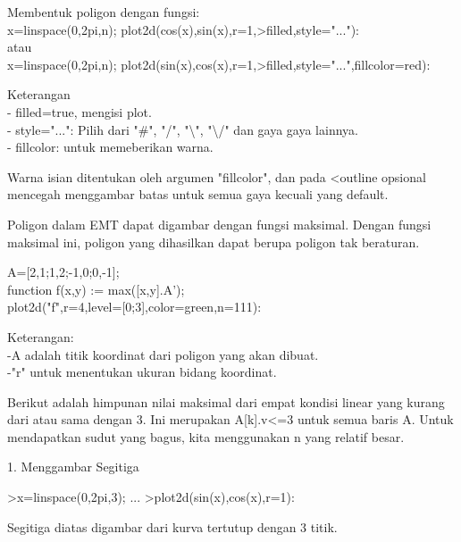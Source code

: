 \documentclass[a4paper,10pt]{article}
\begin{document}
\begin{eulernotebook}
\begin{eulercomment}
\begin{eulercomment}
\begin{eulercomment}
\begin{eulercomment}
\begin{eulercomment}
\begin{eulercomment}
\begin{eulercomment}
\begin{eulercomment}
\begin{eulercomment}
\begin{eulercomment}
\begin{eulercomment}
\begin{eulercomment}
\begin{eulercomment}
Membentuk poligon dengan fungsi:\\
x=linspace(0,2pi,n); plot2d(cos(x),sin(x),r=1,\textgreater{}filled,style="..."):\\
atau\\
x=linspace(0,2pi,n);
plot2d(sin(x),cos(x),r=1,\textgreater{}filled,style="...",fillcolor=red):

Keterangan\\
- filled=true, mengisi plot.\\
- style="...": Pilih dari "#", "/", "\textbackslash{}", "\textbackslash{}/" dan gaya gaya lainnya.\\
- fillcolor: untuk memeberikan warna.

Warna isian ditentukan oleh argumen "fillcolor", dan pada \textless{}outline
opsional mencegah menggambar batas untuk semua gaya kecuali yang
default.

Poligon dalam EMT dapat digambar dengan fungsi maksimal. Dengan fungsi
maksimal ini, poligon yang dihasilkan dapat berupa poligon tak
beraturan.

A=[2,1;1,2;-1,0;0,-1];\\
function f(x,y) := max([x,y].A');\\
plot2d("f",r=4,level=[0;3],color=green,n=111):

Keterangan:\\
-A adalah titik koordinat dari poligon yang akan dibuat.\\
-"r" untuk menentukan ukuran bidang koordinat.

Berikut adalah himpunan nilai maksimal dari empat kondisi linear yang
kurang dari atau sama dengan 3. Ini merupakan A[k].v\textless{}=3 untuk semua
baris A. Untuk mendapatkan sudut yang bagus, kita menggunakan n yang
relatif besar.


1. Menggambar Segitiga
\end{eulercomment}
\begin{eulerprompt}
>x=linspace(0,2pi,3); ...
>plot2d(sin(x),cos(x),r=1):
\end{eulerprompt}
\begin{eulercomment}
Segitiga diatas digambar dari kurva tertutup dengan 3 titik.


\end{eulercomment}
\end{eulercomment}
\end{eulercomment}
\end{eulercomment}
\end{eulercomment}
\end{eulercomment}
\end{eulercomment}
\end{eulercomment}
\end{eulercomment}
\end{eulercomment}
\end{eulercomment}
\end{eulercomment}
\end{eulercomment}
\end{eulernotebook}
\end{document}
